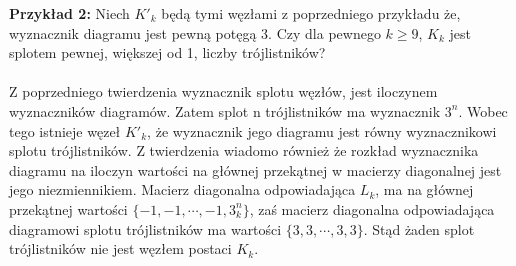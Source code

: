  \textbf{Przykład 2:}
 Niech $K'_{k}$ będą tymi węzłami z poprzedniego przykładu że, wyznacznik diagramu jest pewną potęgą 3. Czy dla pewnego $k\geq9$, $K_{k}$  jest splotem pewnej, większej od 1, liczby trójlistników? \\ \\
 Z poprzedniego twierdzenia wyznacznik splotu węzłów, jest iloczynem wyznaczników diagramów. Zatem splot n trójlistników ma wyznacznik $3^n$. Wobec tego istnieje węzeł $K'_{k}$, że wyznacznik jego diagramu jest równy wyznacznikowi splotu trójlistników. Z twierdzenia wiadomo również że rozkład wyznacznika diagramu na iloczyn wartości na głównej przekątnej w macierzy diagonalnej jest jego niezmiennikiem. Macierz diagonalna odpowiadająca $L_{k}$, ma na głównej przekątnej wartości $\lbrace -1, -1, \cdots, -1, 3^n_{k} \rbrace$, zaś macierz diagonalna odpowiadająca diagramowi splotu trójlistników ma wartości $\lbrace 3, 3, \cdots, 3, 3 \rbrace$. Stąd żaden splot trójlistników nie jest węzłem postaci $K_{k}$.
 

 